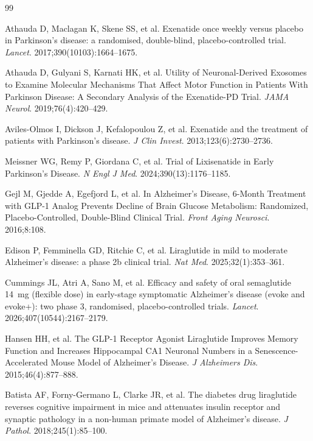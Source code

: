 \documentclass[11pt, a4paper]{article}
\begin{document}

\begin{thebibliography}{99}

 Athauda D, Maclagan K, Skene SS, et al. Exenatide once
weekly versus placebo in Parkinson's disease: a randomised, double-blind,
placebo-controlled trial. \textit{Lancet}. 2017;390(10103):1664--1675.

 Athauda D, Gulyani S, Karnati HK, et al. Utility of
Neuronal-Derived Exosomes to Examine Molecular Mechanisms That Affect Motor
Function in Patients With Parkinson Disease: A Secondary Analysis of the
Exenatide-PD Trial. \textit{JAMA Neurol}. 2019;76(4):420--429.

 Aviles-Olmos I, Dickson J, Kefalopoulou Z, et al.
Exenatide and the treatment of patients with Parkinson's disease.
\textit{J Clin Invest}. 2013;123(6):2730--2736.

 Meissner WG, Remy P, Giordana C, et al. Trial of
Lixisenatide in Early Parkinson's Disease. \textit{N Engl J Med}.
2024;390(13):1176--1185.

 Gejl M, Gjedde A, Egefjord L, et al. In Alzheimer's
Disease, 6-Month Treatment with GLP-1 Analog Prevents Decline of Brain
Glucose Metabolism: Randomized, Placebo-Controlled, Double-Blind Clinical
Trial. \textit{Front Aging Neurosci}. 2016;8:108.

 Edison P, Femminella GD, Ritchie C, et al. Liraglutide
in mild to moderate Alzheimer's disease: a phase 2b clinical trial.
\textit{Nat Med}. 2025;32(1):353--361.

 Cummings JL, Atri A, Sano M, et al. Efficacy and
safety of oral semaglutide 14~mg (flexible dose) in early-stage symptomatic
Alzheimer's disease (evoke and evoke+): two phase 3, randomised,
placebo-controlled trials. \textit{Lancet}. 2026;407(10544):2167--2179.

 Hansen HH, et al. The GLP-1 Receptor Agonist
Liraglutide Improves Memory Function and Increases Hippocampal CA1
Neuronal Numbers in a Senescence-Accelerated Mouse Model of Alzheimer's
Disease. \textit{J Alzheimers Dis}. 2015;46(4):877--888.

 Batista AF, Forny-Germano L, Clarke JR, et al. The
diabetes drug liraglutide reverses cognitive impairment in mice and
attenuates insulin receptor and synaptic pathology in a non-human primate
model of Alzheimer's disease. \textit{J Pathol}. 2018;245(1):85--100.


\end{thebibliography}
\end{document}
